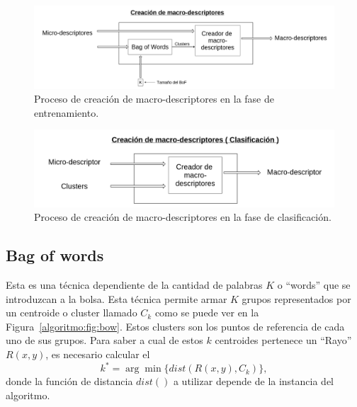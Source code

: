 	\begin{figure}[bt]
		\centering
    		\includegraphics[width=1\textwidth]{Figuras/Diagramas/Extractor_macrodescriptores_entrenamiento.png}
  		\caption{Proceso de creación de macro-descriptores en la fase de entrenamiento.}
  		\label{algoritmo:fig:macro_descriptores:entrenamiento}
	\end{figure}	
	
	
	\begin{figure}[bt]
		\centering
    		\includegraphics[width=1\textwidth]{Figuras/Diagramas/Extractor_macrodescriptores_clasificacion.png}
  		\caption{Proceso de creación de macro-descriptores en la fase de clasificación.}
  		\label{algoritmo:fig:macro_descriptores:clasificacion}
	\end{figure}	

	\subsection{Bag of words}
	\label{algoritmo:bow}
		Esta es una técnica dependiente de la cantidad de palabras $K$ o ``words'' que se introduzcan a la bolsa. Esta técnica permite armar $K$ grupos representados por un centroide o cluster llamado $C_k$ como se puede ver en la Figura~\ref{algoritmo:fig:bow}. Estos clusters son los puntos de referencia de cada uno de sus grupos. Para saber a cual de estos $k$ centroides pertenece un ``Rayo'' $R(x,y)$, es necesario calcular el
		\begin{equation}
  			\label{algoritmo:eq:dist}
			k^* = \arg \min\{dist(R(x,y),C_k)\},
		\end{equation}
		donde la función de distancia $dist()$ a utilizar depende de la instancia del algoritmo.

